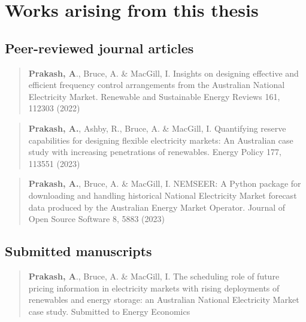 \documentclass[12pt,a4paper,]{report}
\begin{document}
\newpage

\hypertarget{works-arising-from-this-thesis}{%
\chapter*{Works arising from this
thesis}\label{works-arising-from-this-thesis}}

\hypertarget{peer-reviewed-journal-articles}{%
\section*{Peer-reviewed journal
articles}\label{peer-reviewed-journal-articles}}

\begin{quote}
\textbf{Prakash, A}., Bruce, A. \& MacGill, I. Insights on designing
effective and efficient frequency control arrangements from the
Australian National Electricity Market. Renewable and Sustainable Energy
Reviews 161, 112303 (2022)
\end{quote}

\begin{quote}
\textbf{Prakash, A.}, Ashby, R., Bruce, A. \& MacGill, I. Quantifying
reserve capabilities for designing flexible electricity markets: An
Australian case study with increasing penetrations of renewables. Energy
Policy 177, 113551 (2023)
\end{quote}

\begin{quote}
\textbf{Prakash, A.}, Bruce, A. \& MacGill, I. NEMSEER: A Python package
for downloading and handling historical National Electricity Market
forecast data produced by the Australian Energy Market Operator. Journal
of Open Source Software 8, 5883 (2023)
\end{quote}

\hypertarget{submitted-manuscripts}{%
\section*{Submitted manuscripts}\label{submitted-manuscripts}}

\begin{quote}
\textbf{Prakash, A}., Bruce, A. \& MacGill, I. The scheduling role of
future pricing information in electricity markets with rising
deployments of renewables and energy storage: an Australian National
Electricity Market case study. Submitted to Energy Economics
\end{quote}
\end{document}
